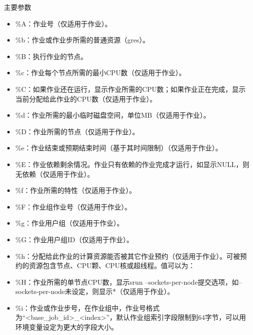 \begin{frame}[fragile]{主要参数}
\begin{itemize}
\begin{itemize}
\begin{itemize}
    \item \%A：作业号（仅适用于作业）。
    \item \%b：作业或作业步所需的普通资源（gres）。
    \item \%B：执行作业的节点。
    \item \%c：作业每个节点所需的最小CPU数（仅适用于作业）。
    \item \%C：如果作业还在运行，显示作业所需的CPU数；如果作业正在完成，显示当前分配给此作业的CPU数（仅适用于作业）。
    \item \%d：作业所需的最小临时磁盘空间，单位MB（仅适用于作业）。
    \item \%D：作业所需的节点（仅适用于作业）。
    \item \%e：作业结束或预期结束时间（基于其时间限制）（仅适用于作业）。
    \item \%E：作业依赖剩余情况。作业只有依赖的作业完成才运行，如显示NULL，则无依赖（仅适用于作业）。
    \item \%f：作业所需的特性（仅适用于作业）。
    \item \%F：作业组作业号（仅适用于作业）。
    \item \%g：作业用户组（仅适用于作业）。
    \item \%G：作业用户组ID（仅适用于作业）。
    \item \%h：分配给此作业的计算资源能否被其它作业预约（仅适用于作业）。可被预约的资源包含节点、CPU颗、CPU核或超线程。值可以为：
    \item \%H：作业所需的单节点CPU数，显示srun --sockets-per-node提交选项，如--sockets-per-node未设定，则显示*（仅适用于作业）。
    \item \%i：作业或作业步号，在作业组中，作业号格式为``<base\_job\_id>\_<index>''，默认作业组索引字段限制到64字节，可以用环境变量设定为更大的字段大小。

\end{itemize}
\end{itemize}
\end{itemize}
\end{frame}
